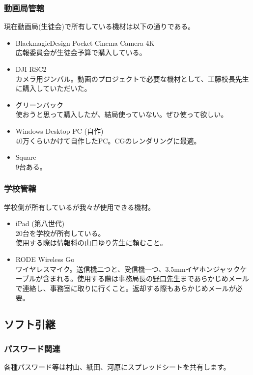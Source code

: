 \documentclass[dvipdfmx,jb5]{jarticle}
\newcommand{\mail}[2]{\href{mailto:#2}{#1}}
\begin{document}
\subsubsection{動画局管轄}
 現在動画局(生徒会)で所有している機材は以下の通りである。
 \begin{itemize}
  \item BlackmagicDesign Pocket Cinema Camera 4K\\
  広報委員会が生徒会予算で購入している。
  \item DJI RSC2\\
  カメラ用ジンバル。動画のプロジェクトで必要な機材として、工藤校長先生に購入していただいた。
  \item グリーンバック\\
  使おうと思って購入したが、結局使っていない。ぜひ使って欲しい。
  \item Windows Desktop PC (自作)\\
 40万くらいかけて自作したPC。CGのレンダリングに最適。
  \item Square\\
  9台ある。
 \end{itemize}

 \subsubsection{学校管轄}
 学校側が所有しているが我々が使用できる機材。
 \begin{itemize}
  \item iPad (第八世代)\\
  20台を学校が所有している。\\
  使用する際は情報科の\mail{山口ゆり先生}{yuri.yamaguchi@seiko.ac.jp}に頼むこと。
  \item RODE Wireless Go\\
  ワイヤレスマイク。送信機二つと、受信機一つ、3.5mmイヤホンジャックケーブルが含まれる。使用する際は事務局長の\mail{野口先生}{noguchi@seiko.ac.jp}まであらかじめメールで連絡し、事務室に取りに行くこと。返却する際もあらかじめメールが必要。
 \end{itemize}

 \subsection{ソフト引継}
 \subsubsection{パスワード関連}
 各種パスワード等は村山、紙田、河原にスプレッドシートを共有します。
\end{document}

